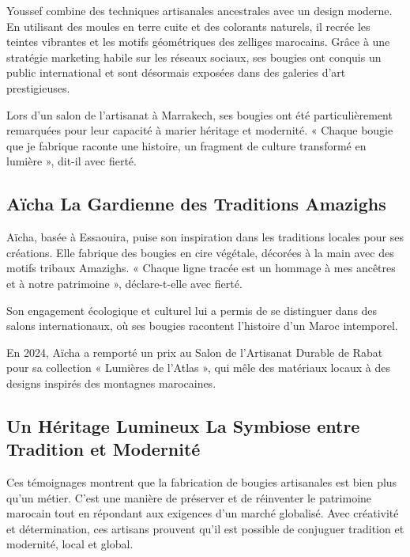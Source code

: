 \documentclass[11pt,fleqn,onecolumn,oneside]{book}
\begin{document}
Youssef combine des techniques artisanales ancestrales avec un design moderne. En utilisant des moules en terre cuite et des colorants naturels, il recrée les teintes vibrantes et les motifs géométriques des zelliges marocains. Grâce à une stratégie marketing habile sur les réseaux sociaux, ses bougies ont conquis un public international et sont désormais exposées dans des galeries d’art prestigieuses.

\begin{example}
Lors d’un salon de l’artisanat à Marrakech, ses bougies ont été particulièrement remarquées pour leur capacité à marier héritage et modernité. « Chaque bougie que je fabrique raconte une histoire, un fragment de culture transformé en lumière », dit-il avec fierté.
\end{example}

\subsection*{Aïcha La Gardienne des Traditions Amazighs}

Aïcha, basée à Essaouira, puise son inspiration dans les traditions locales pour ses créations. Elle fabrique des bougies en cire végétale, décorées à la main avec des motifs tribaux Amazighs. « Chaque ligne tracée est un hommage à mes ancêtres et à notre patrimoine », déclare-t-elle avec fierté.

Son engagement écologique et culturel lui a permis de se distinguer dans des salons internationaux, où ses bougies racontent l’histoire d’un Maroc intemporel.

\begin{example}
En 2024, Aïcha a remporté un prix au Salon de l’Artisanat Durable de Rabat pour sa collection « Lumières de l’Atlas », qui mêle des matériaux locaux à des designs inspirés des montagnes marocaines.
\end{example}

\subsection*{Un Héritage Lumineux La Symbiose entre Tradition et Modernité}

Ces témoignages montrent que la fabrication de bougies artisanales est bien plus qu’un métier. C’est une manière de préserver et de réinventer le patrimoine marocain tout en répondant aux exigences d’un marché globalisé. Avec créativité et détermination, ces artisans prouvent qu’il est possible de conjuguer tradition et modernité, local et global.
\end{document}
